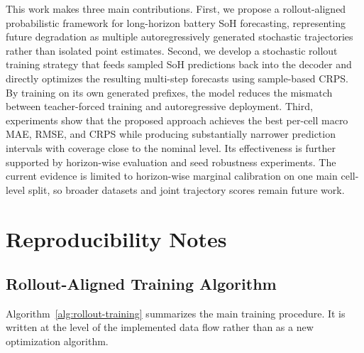 \documentclass[conference]{IEEEtran}
\begin{document}
This work makes three main contributions. First, we propose a rollout-aligned
probabilistic framework for long-horizon battery SoH forecasting, representing
future degradation as multiple autoregressively generated stochastic
trajectories rather than isolated point estimates. Second, we develop a
stochastic rollout training strategy that feeds sampled SoH predictions back
into the decoder and directly optimizes the resulting multi-step forecasts
using sample-based CRPS. By training on its own generated prefixes, the model
reduces the mismatch between teacher-forced training and autoregressive
deployment. Third, experiments show that the proposed approach achieves the
best per-cell macro MAE, RMSE, and CRPS while producing substantially narrower
prediction intervals with coverage close to the nominal level. Its
effectiveness is further supported by horizon-wise evaluation and seed
robustness experiments. The current evidence is limited to horizon-wise
marginal calibration on one main cell-level split, so broader datasets and
joint trajectory scores remain future work.

\appendices

\section{Reproducibility Notes}

\subsection{Rollout-Aligned Training Algorithm}

Algorithm~\ref{alg:rollout-training} summarizes the main training procedure.
It is written at the level of the implemented data flow rather than as a new
optimization algorithm.
\end{document}
